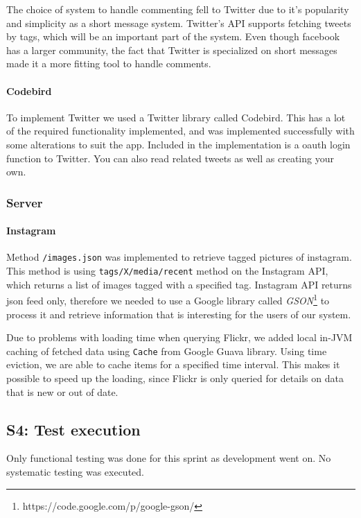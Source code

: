 \documentclass[11pt]{book}
\begin{document}
The choice of system to handle commenting fell to Twitter due to it’s popularity and simplicity as a short message system. Twitter’s API supports fetching tweets by tags, which will be an important part of the system. Even though facebook has a larger community, the fact that Twitter is specialized on short messages made it a more fitting tool to handle comments.

\paragraph{Codebird}
To implement Twitter we used a Twitter library called Codebird. This has a lot of the required functionality implemented, and was implemented successfully with some alterations to suit the app. Included in the implementation is a oauth login function to Twitter. You can also read related tweets as well as creating your own.

\subsubsection{Server}

\paragraph{Instagram}
Method \texttt{/images.json} was implemented to retrieve tagged pictures of instagram. This method is using \texttt{tags/X/media/recent} method on the Instagram API, which returns a list of images tagged with a specified tag. Instagram API returns \gls{json} feed only, therefore we needed to use a Google library called \emph{GSON}\footnote{https://code.google.com/p/google-gson/} to process it and retrieve information that is interesting for the users of our system.

Due to problems with loading time when querying Flickr, we added local in-JVM caching of fetched data using \texttt{Cache} from Google Guava library. Using time eviction, we are able to cache items for a specified time interval. This makes it possible to speed up the loading, since Flickr is only queried for details on data that is new or out of date.


\subsection{S4: Test execution}
Only functional testing was done for this sprint as development went on. No systematic testing was executed.
\end{document}

